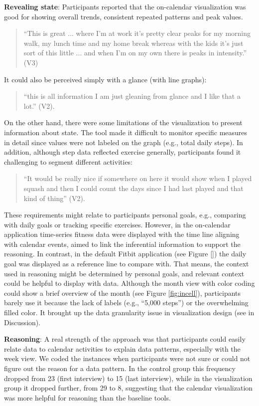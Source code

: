 \documentclass[12pt,oneside]{book}
\begin{document}
\textbf{Revealing state}: Participants reported that the on-calendar visualization was good for showing overall trends, consistent repeated patterns and peak values. 
\begin{quote}
``This is great ... where I{\rq}m at work it{\rq}s pretty clear peaks for my morning walk, my lunch time and my home break whereas with the kids it{\rq}s just sort of this little ... and when I{\rq}m on my own there is peaks in intensity.'' (V3)
\end{quote}
 It could also be perceived simply with a glance (with line graphs): 
 \begin{quote}
	 ``this is all information I am just gleaning from glance and I like that a lot.'' (V2).
\end{quote}
 On the other hand, there were some limitations of the visualization to present information about state. The tool made it difficult to monitor specific measures in detail since values were not labeled on the graph (e.g., total daily steps). In addition, although step data reflected exercise generally, participants found it challenging to segment different activities: 
\begin{quote}
	``It would be really nice if somewhere on here it would show when I played squash and then I could count the days since I had last played and that kind of thing'' (V2). 
\end{quote}
These requirements might relate to participants personal goals, e.g., comparing with daily goals or tracking specific exercises. However, in the on-calendar application time-series fitness data were displayed with the time line aligning with calendar events, aimed to link the inferential information to support the reasoning. In contrast, in the default Fitbit application (see Figure \ref{}) the daily goal was displayed as a reference line to compare with. That means, the context used in reasoning might be determined by personal goals, and relevant context could be helpful to display with data. Although the month view with color coding could show a brief overview of the month (see Figure \ref{fig:incell}), participants barely use it because the lack of labels (e.g., ``5,000 steps'') or the overwhelming filled color. It brought up the data granularity issue in visualization design (see in Discussion).

\textbf{Reasoning}: A real strength of the approach was that participants could easily relate data to calendar activities to explain data patterns, especially with the week view. We coded the instances when participants were not sure or could not figure out the reason for a data pattern. In the control group this frequency dropped from 23 (first interview) to 15 (last interview), while in the visualization group it dropped further, from 29 to 8, suggesting that the calendar visualization was more helpful for reasoning than the baseline tools.
\end{document}
